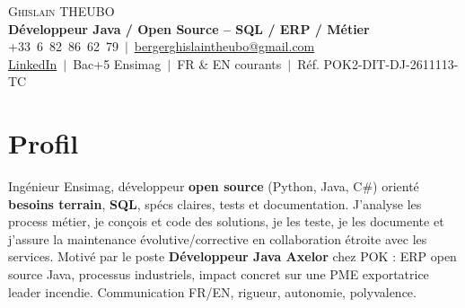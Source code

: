 \documentclass[a4paper,10.5pt]{article}
\begin{document}
\begin{center}
{\Huge \scshape Ghislain THEUBO}\\[3pt]
\textbf{D\'eveloppeur Java / Open Source -- SQL / ERP / M\'etier}\\[2pt]
\small +33~6~82~86~62~79 $\,|\,$ \href{mailto:bergerghislaintheubo@gmail.com}{bergerghislaintheubo@gmail.com}\\[1pt]
\href{https://www.linkedin.com/in/berger-ghislain}{LinkedIn} $\,|\,$ Bac+5 Ensimag $\,|\,$ FR \& EN courants $\,|\,$ R\'ef. POK2-DIT-DJ-2611113-TC
\end{center}

\section{Profil}
\small{
Ing\'enieur Ensimag, d\'eveloppeur \textbf{open source} (Python, Java, C\#) orient\'e \textbf{besoins terrain},
\textbf{SQL}, sp\'ecs claires, tests et documentation. J'analyse les process m\'etier, je con\c{c}ois et code
des solutions, je les teste, je les documente et j'assure la maintenance \'evolutive/corrective
en collaboration \'etroite avec les services. Motiv\'e par le poste \textbf{D\'eveloppeur Java Axelor}
chez POK : ERP open source Java, processus industriels, impact concret sur une PME exportatrice
leader incendie. Communication FR/EN, rigueur, autonomie, polyvalence.
}
\end{document}

